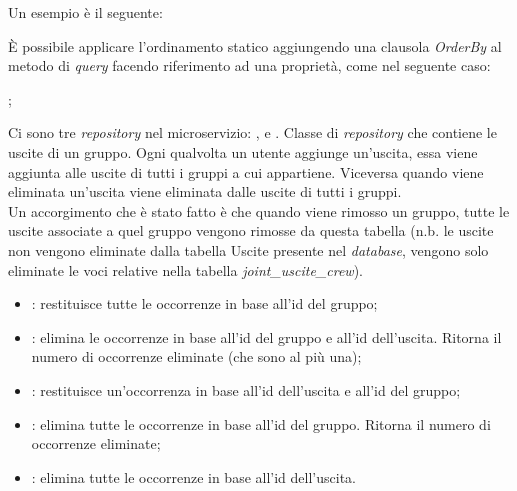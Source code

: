  Un esempio è il seguente: 
 \begin{center}
 \end{center}
È possibile applicare l'ordinamento statico aggiungendo una clausola \textit{OrderBy} al metodo di \textit{query} facendo riferimento ad una proprietà, come nel seguente caso:  
\begin{center}
    ;
\end{center}
Ci sono tre \textit{repository} nel \gls{microservizio}: ,  e . 
\label{JointUsciteCrewRepository}
Classe di \textit{repository} che contiene le uscite di un gruppo. Ogni qualvolta un utente aggiunge un'uscita, essa viene aggiunta alle uscite di tutti i gruppi a cui appartiene. Viceversa quando viene eliminata un'uscita viene eliminata dalle uscite di tutti i gruppi.\\
Un accorgimento che è stato fatto è che quando viene rimosso un gruppo, tutte le uscite associate a quel gruppo vengono rimosse da questa tabella (n.b. le uscite non vengono eliminate dalla tabella Uscite presente nel \textit{database}, vengono solo eliminate le voci relative nella tabella \textit{joint\_uscite\_crew}).
\begin{itemize}
    \item {}: restituisce tutte le occorrenze in base all'id del gruppo;
    \item {}: elimina le occorrenze in base all'id del gruppo e all'id dell'uscita. Ritorna il numero di occorrenze eliminate (che sono al più una);
    \item {}: restituisce un'occorrenza in base all'id dell'uscita e all'id del gruppo;
    \item {}: elimina tutte le occorrenze in base all'id del gruppo. Ritorna il numero di occorrenze eliminate;
    \item {}: elimina tutte le occorrenze in base all'id dell'uscita.
\end{itemize}






